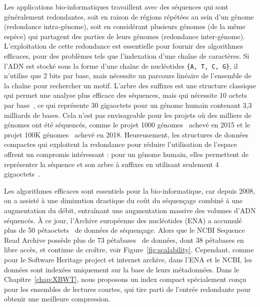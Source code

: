 Les applications bio-informatiques travaillent avec des séquences qui sont généralement redondantes, soit en raison de régions répétées au sein d'un génome (redondance intra-génome), soit en considérant plusieurs génomes (de la même espèce) qui partagent des parties de leurs génomes (redondance inter-génome).
L'exploitation de cette redondance est essentielle pour fournir des algorithmes efficaces, pour des problèmes tels que l'indexation d'une chaîne de caractères.
Si l'ADN est stocké sous la forme d'une chaîne de nucléotides \texttt{\{A, T, C, G\}}, il n'utilise que 2 bits par base, mais nécessite un parcours linéaire de l'ensemble de la chaîne pour rechercher un motif. 
L'arbre des suffixes est une structure classique qui permet une analyse plus efficace des séquences, mais qui nécessite 10 octets par base~\cite{navarro2016compact}, ce qui représente 30 gigaoctets pour un génome humain contenant 3,3 milliards de bases. 
Cela n'est pas envisageable pour les projets où des milliers de génomes ont été séquencés, comme le projet 1000 génomes~\cite{10002015global} achevé en 2015 et le projet 100K génomes~\cite{100Kgenomes} achevé en 2018. 
Heureusement, les structures de données compactes qui exploitent la redondance pour réduire l'utilisation de l'espace offrent un compromis intéressant : pour un génome humain, elles permettent de représenter la séquence et son arbre à suffixes en utilisant seulement 4 gigaoctets~\cite{navarro2016compact}.

Les algorithmes efficaces sont essentiels pour la bio-informatique, car depuis 2008, on a assisté à une diminution drastique du coût du séquençage combiné à une augmentation du débit, entraînant une augmentation massive des volumes d'ADN séquencés. 
À ce jour, l'Archive européenne des nucléotides (ENA) a accumulé plus de 50 pétaoctets~\cite{ena} de données de séquençage.
Alors que le NCBI Sequence Read Archive possède plus de 73 pétabases~\cite{sra} de données, dont 38 pétabases en libre accès, et continue de croître, voir Figure~\ref{fig:scalability}. Cependant, comme pour le Software Heritage project et internet archive, dans l'ENA et le NCBI, les données sont indexées uniquement sur la base de leurs métadonnées.
Dans le Chapitre~\ref{chap:XBWT}, nous proposons un index compact spécialement conçu pour les ensembles de lectures courtes, qui tire parti de l'entrée redondante pour obtenir une meilleure compression.

